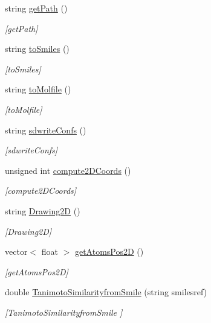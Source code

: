 \begin{DoxyCompactItemize}
string \hyperlink{class_molecule_a5d97408c9357663ceb2b2bff4471c602}{get\+Path} ()
\begin{DoxyCompactList}\small\item\em \mbox{[}get\+Path\mbox{]} \end{DoxyCompactList}\item 
string \hyperlink{class_molecule_a0ccd79755ccd96be3d17eacfe77b1a07}{to\+Smiles} ()
\begin{DoxyCompactList}\small\item\em \mbox{[}to\+Smiles\mbox{]} \end{DoxyCompactList}\item 
string \hyperlink{class_molecule_abf1fa50884e0dc53421416c3731689db}{to\+Molfile} ()
\begin{DoxyCompactList}\small\item\em \mbox{[}to\+Molfile\mbox{]} \end{DoxyCompactList}\item 
string \hyperlink{class_molecule_a4c3f4a82ffe6453c231d78aef0af5efd}{sdwrite\+Confs} ()
\begin{DoxyCompactList}\small\item\em \mbox{[}sdwrite\+Confs\mbox{]} \end{DoxyCompactList}\item 
unsigned int \hyperlink{class_molecule_a0add82d890a92f6b9cab8099becf966f}{compute2\+D\+Coords} ()
\begin{DoxyCompactList}\small\item\em \mbox{[}compute2\+D\+Coords\mbox{]} \end{DoxyCompactList}\item 
string \hyperlink{class_molecule_a7048877e6bd7ac8c34f760ce9e92dc31}{Drawing2\+D} ()
\begin{DoxyCompactList}\small\item\em \mbox{[}Drawing2\+D\mbox{]} \end{DoxyCompactList}\item 
vector$<$ float $>$ \hyperlink{class_molecule_aa995ba2f208be94be9d1bbb756cb1e91}{get\+Atoms\+Pos2\+D} ()
\begin{DoxyCompactList}\small\item\em \mbox{[}get\+Atoms\+Pos2\+D\mbox{]} \end{DoxyCompactList}\item 
double \hyperlink{class_molecule_a2f83a282a6276fb330b46831a29907d6}{Tanimoto\+Similarityfrom\+Smile} (string smilesref)
\begin{DoxyCompactList}\small\item\em \mbox{[}Tanimoto\+Similarityfrom\+Smile \mbox{]} \end{DoxyCompactList}\item 

\end{DoxyCompactItemize}
